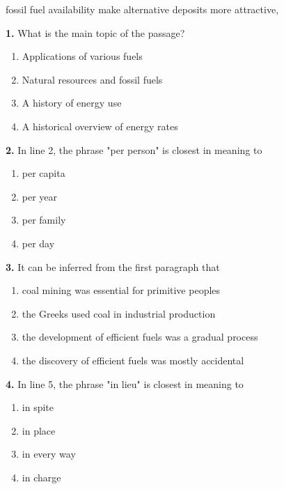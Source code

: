 \documentclass[12pt]{article}
\begin{document}
fossil fuel availability make alternative deposits more attractive,\par
\endgroup
\medskip
\noindent\textbf{1.} What is the main topic of the passage?
\begin{enumerate}[label=(\Alph*),leftmargin=*,itemsep=0.2em]
\item Applications of various fuels
\item Natural resources and fossil fuels
\item A history of energy use
\item A historical overview of energy rates
\end{enumerate}
\par
\vspace{0.25\baselineskip}
\noindent\textbf{2.} In line 2, the phrase "per person" is closest in meaning to
\begin{enumerate}[label=(\Alph*),leftmargin=*,itemsep=0.2em]
\item per capita
\item per year
\item per family
\item per day
\end{enumerate}
\par
\vspace{0.25\baselineskip}
\noindent\textbf{3.} It can be inferred from the first paragraph that
\begin{enumerate}[label=(\Alph*),leftmargin=*,itemsep=0.2em]
\item coal mining was essential for primitive peoples
\item the Greeks used coal in industrial production
\item the development of efficient fuels was a gradual process
\item the discovery of efficient fuels was mostly accidental
\end{enumerate}
\par
\vspace{0.25\baselineskip}
\noindent\textbf{4.} In line 5, the phrase "in lieu" is closest in meaning to
\begin{enumerate}[label=(\Alph*),leftmargin=*,itemsep=0.2em]
\item in spite
\item in place
\item in every way
\item in charge
\end{enumerate}
\par
\vspace{0.25\baselineskip}
\end{document}
